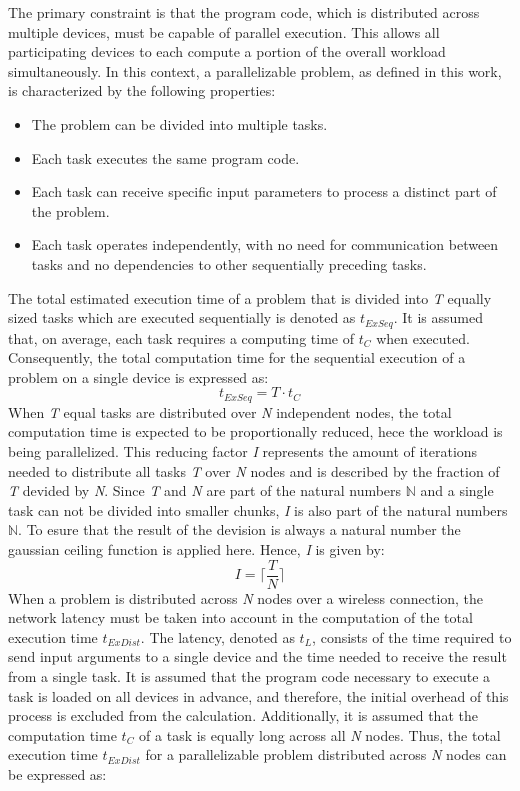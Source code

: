 The primary constraint is that the program code, which is distributed across multiple devices, must be capable of parallel execution. This allows all participating devices to  each compute a portion of the overall workload simultaneously. In this context, a parallelizable problem, as defined in this work, is characterized by the following properties:
\begin{itemize}
  \item The problem can be divided into multiple tasks.
  \item Each task executes the same program code.
  \item Each task can receive specific input parameters to process a distinct part of the problem.
  \item Each task operates independently, with no need for communication between tasks and no dependencies to other sequentially preceding tasks.
\end{itemize}
The total estimated execution time of a problem that is divided into \emph{T} equally sized tasks which are executed sequentially is denoted as $t_{ExSeq}$. It is assumed that, on average, each task requires a computing time of $t_{C}$ when executed. Consequently, the total computation time for the sequential execution of a problem on a single device is expressed as:
\begin{equation}
  t_{ExSeq} = T \cdot t_{C}
  \label{equ:single}
\end{equation}
When \emph{T} equal tasks are distributed over \emph{N} independent nodes, the total computation time is expected to be proportionally reduced, hece the workload is being parallelized. This reducing factor \emph{I} represents the amount of iterations needed to distribute all tasks \emph{T} over \emph{N} nodes and is described by the fraction of \emph{T} devided by \emph{N}. Since \emph{T} and \emph{N} are part of the natural numbers $\mathbb{N}$ and a single task can not be divided into smaller chunks, \emph{I} is also part of the natural numbers $\mathbb{N}$. To esure that the result of the devision is always a natural number the gaussian ceiling function is applied here. Hence, \emph{I} is given by: 
\begin{equation}
  I = \bigg\lceil\frac{T}{N}\bigg\rceil
  \label{equ:frac}
\end{equation}
When a problem is distributed across \emph{N} nodes over a wireless connection, the network latency must be taken into account in the computation of the total execution time $t_{ExDist}$. The latency, denoted as $t_{L}$, consists of the time required to send input arguments to a single device and the time needed to receive the result from a single task. It is assumed that the program code necessary to execute a task is loaded on all devices in advance, and therefore, the initial overhead of this process is excluded from the calculation. Additionally, it is assumed that the computation time $t_{C}$ of a task is equally long across all \emph{N} nodes. Thus, the total execution time $t_{ExDist}$ for a parallelizable problem distributed across \emph{N} nodes can be expressed as: 
